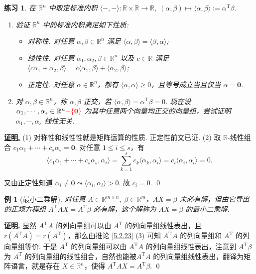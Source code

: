 \documentclass[10pt,openany]{article}
\theoremstyle{thmstyle} %
\newtheorem{practice}{练习}[section]
\theoremstyle{defstyle} %
\theoremstyle{prostyle} %
\theoremstyle{exastyle}
\newtheorem{example}[theorem]{例}
\theoremstyle{remstyle}
\renewenvironment{proof}[1][证明]{\par\underline{\textbf{#1.}} \;\fangsong}{\qed\par}
\newcommand{\T}{^{\text{T}}}
\newcommand{\R}{\mathbb{R}}
\begin{document}
\begin{practice}
	在 \( \R^n \) 中取定标准内积 \( \langle -,- \rangle: \R \times \R \to \R, \; (\alpha,\beta) \mapsto \langle \alpha,\beta \rangle:=\alpha\T\beta \).
	\begin{enumerate}[(1)]
		\item 验证 \( \R^n \) 中的标准内积满足如下性质:
		\begin{itemize}
			\item 对称性. \; 对任意 \( \alpha,\beta \in \R^n \) 满足 \( \langle \alpha,\beta \rangle=\langle \beta,\alpha \rangle \);
			\item 线性性. \; 对任意 \( \alpha_1,\alpha_2,\beta \in \R^n \) 以及 \( c \in \R \) 满足 \( \langle c\alpha_1+\alpha_2,\beta \rangle=c\langle \alpha_1,\beta \rangle+\langle \alpha_2,\beta \rangle \);
			\item 正定性. \; 对任意 \( \alpha \in \R^n \)，都有 \( \langle \alpha,\alpha \rangle \geq 0 \)，且等号成立当且仅当 \( \alpha=\bm{0} \).
		\end{itemize}
		
		\item 对 \( \alpha,\beta \in \R^n \)，称 \( \alpha,\beta \) 正交，若 \( \langle \alpha,\beta \rangle=\alpha\T\beta=0 \). 现在设 \( \alpha_1,\cdots,\alpha_s \in \R^n{\color{red}-\{\bm{0}\}} \) 为其中任意两个向量均正交的向量组，尝试证明 \( \alpha_1,\cdots,\alpha_s  \) 线性无关.
	\end{enumerate}
\end{practice}


\begin{proof}
	(1) 对称性和线性性就是矩阵运算的性质. 正定性前文已证. 
	(2) 取 \( \R\)-线性组合 \( c_1\alpha_1+\cdots+c_s\alpha_s=\bm{0} \). 对任意 \( 1 \leq i \leq s \)，有
	\[ \langle c_1\alpha_1+\cdots+c_s\alpha_s,\alpha_i \rangle= \sum_{k=1}^{s} c_k \langle \alpha_k,\alpha_i \rangle= c_i \langle \alpha_i,\alpha_i \rangle=0. \]
	
	又由正定性知道 \( \alpha_i \neq \bm{0} \leadsto \langle \alpha_i,\alpha_i \rangle>0 \). 故 \( c_i=0 \).
\end{proof}

\begin{example}[最小二乘解] \label{5.3.14}
	对任意 \( A \in \R^{m \times n}, \; \beta \in \R^m \)，\( AX=\beta \) 未必有解，但由它导出的正规方程组 \( A\T AX=A\T \beta \) 必有解，这个解称为 \( AX=\beta \) 的最小二乘解.
\end{example}


\begin{proof}
	显然 \( A\T A \) 的列向量组可以由 \( A\T \) 的列向量组线性表出，且 \( r(A\T A)=r(A\T) \)，那么由推论 \ref{5.2.23} (3) 可知 \( A\T A \) 的列向量组和 \( A\T \) 的列向量组等价. 于是 \( A\T \) 的列向量组可以由 \( A\T A \) 的列向量组线性表出，注意到 \( A\T \beta \) 为 \( A\T \) 的列向量组的线性组合，自然也能被\( A\T A \) 的列向量组线性表出，翻译为矩阵语言，就是存在 \( X \in \R^n \)，使得 \( A\T AX=A\T \beta \).
\end{proof}
\end{document}

